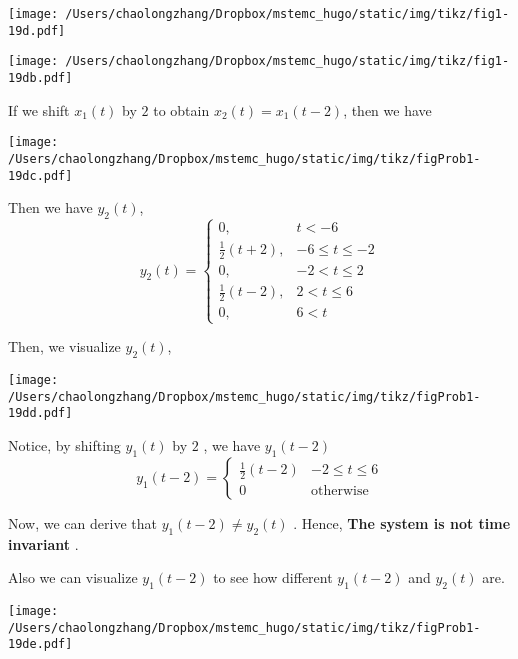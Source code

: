 \documentclass[koma,a4paper,utopia,12pt,listings-color,microtype,paralist,colorlinks,urlcolor=red]{org-article}
\begin{document}
\begin{center}
\texttt{[image: /Users/chaolongzhang/Dropbox/mstemc\_hugo/static/img/tikz/fig1-19d.pdf]}
\end{center}


\begin{center}
\texttt{[image: /Users/chaolongzhang/Dropbox/mstemc\_hugo/static/img/tikz/fig1-19db.pdf]}
\end{center}

If we shift \(x_{1}(t)\) by \(2\) to obtain \(x_{2}(t) = x_{1}(t-2)\), then we have


\begin{center}
\texttt{[image: /Users/chaolongzhang/Dropbox/mstemc\_hugo/static/img/tikz/figProb1-19dc.pdf]}
\end{center}

Then we have \(y_{2}(t)\),
\begin{equation*}
y_{2}(t) =
\begin{cases}
0, & t < -6 \\
\tfrac{1}{2}( t+2 ), & -6 \leq t \leq -2 \\
0, & -2 < t \leq 2 \\
\frac{1}{2} (t-2), & 2 < t \leq 6 \\
0, & 6 < t
\end{cases}
\end{equation*}

Then, we visualize \(y_{2}(t)\),

\begin{center}
\texttt{[image: /Users/chaolongzhang/Dropbox/mstemc\_hugo/static/img/tikz/figProb1-19dd.pdf]}
\end{center}

Notice, by shifting \(y_{1}(t)\) by \(2\) , we have \(y_{1}(t-2)\)
\begin{equation*}
y_{1}(t-2) =
\begin{cases}
\frac{1}{2} (t-2) &  -2 \leq t \leq 6 \\
0 & \mathrm{otherwise}
\end{cases}
\end{equation*}

Now, we can derive that  \(y_{1}(t-2) \neq y_{2}(t)\) . Hence, \textbf{The system is
not time invariant} .

Also we can visualize \(y_{1}(t-2)\) to see how different
\(y_{1}(t-2)\) and \(y_{2}(t)\) are.

\begin{center}
\texttt{[image: /Users/chaolongzhang/Dropbox/mstemc\_hugo/static/img/tikz/figProb1-19de.pdf]}
\end{center}
\end{document}
